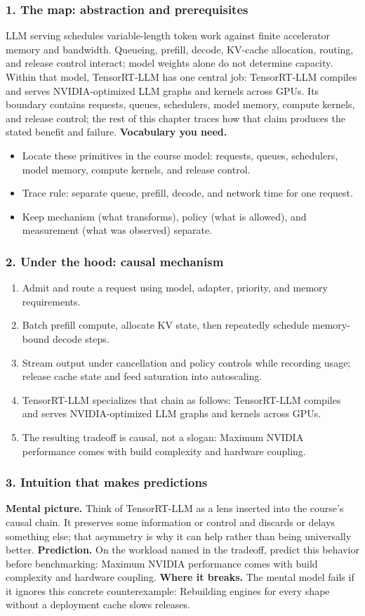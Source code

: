 \subsubsection*{1. The map: abstraction and prerequisites}
LLM serving schedules variable-length token work against finite accelerator memory and bandwidth. Queueing, prefill, decode, KV-cache allocation, routing, and release control interact; model weights alone do not determine capacity.
Within that model, TensorRT-LLM has one central job: TensorRT-LLM compiles and serves NVIDIA-optimized LLM graphs and kernels across GPUs. Its boundary contains requests, queues, schedulers, model memory, compute kernels, and release control; the rest of this chapter traces how that claim produces the stated benefit and failure.
\textbf{Vocabulary you need.}\begin{itemize}
\item Locate these primitives in the course model: requests, queues, schedulers, model memory, compute kernels, and release control.
\item Trace rule: separate queue, prefill, decode, and network time for one request.
\item Keep mechanism (what transforms), policy (what is allowed), and measurement (what was observed) separate.
\end{itemize}
\subsubsection*{2. Under the hood: causal mechanism}\begin{enumerate}
\item Admit and route a request using model, adapter, priority, and memory requirements.
\item Batch prefill compute, allocate KV state, then repeatedly schedule memory-bound decode steps.
\item Stream output under cancellation and policy controls while recording usage; release cache state and feed saturation into autoscaling.
\item TensorRT-LLM specializes that chain as follows: TensorRT-LLM compiles and serves NVIDIA-optimized LLM graphs and kernels across GPUs.
\item The resulting tradeoff is causal, not a slogan: Maximum NVIDIA performance comes with build complexity and hardware coupling.
\end{enumerate}
\subsubsection*{3. Intuition that makes predictions}
\textbf{Mental picture.} Think of TensorRT-LLM as a lens inserted into the course's causal chain. It preserves some information or control and discards or delays something else; that asymmetry is why it can help rather than being universally better.
\textbf{Prediction.} On the workload named in the tradeoff, predict this behavior before benchmarking: Maximum NVIDIA performance comes with build complexity and hardware coupling.
\textbf{Where it breaks.} The mental model fails if it ignores this concrete counterexample: Rebuilding engines for every shape without a deployment cache slows releases.
